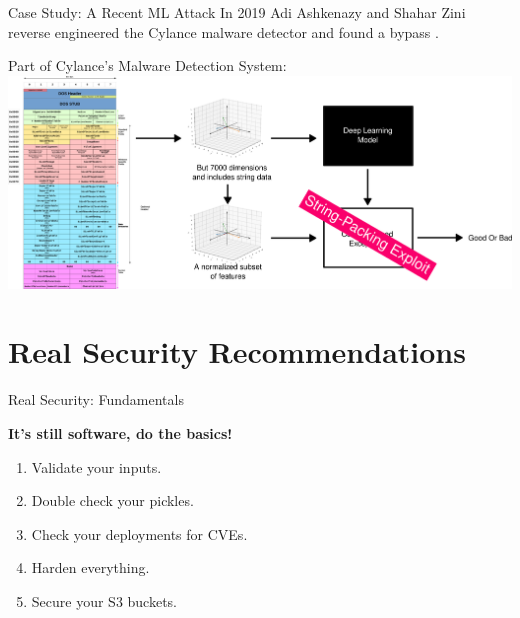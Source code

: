 \documentclass{beamer}
\begin{document}
\begin{frame}{Case Study: A Recent ML Attack}
    In 2019 Adi Ashkenazy and Shahar Zini reverse engineered the Cylance malware detector and found a bypass \cite{cylance_i_kill_you}.
    \vspace{10pt}
    \begin{center}
        Part of Cylance's Malware Detection System:
        \includegraphics[scale=0.15]{cylance_diagram3.png}
    \end{center}
\end{frame}

\section{Real Security Recommendations}

\begin{frame}{Real Security: Fundamentals}
    \begin{center}
        \textbf{It's still software, do the basics!}
        \vspace{20pt}

    \end{center}
    \begin{enumerate}
        \item Validate your inputs. 
        \item Double check your pickles.
        \item Check your deployments for CVEs.
        \item Harden everything.
        \item Secure your S3 buckets.
    \end{enumerate}
\end{frame}
\end{document}
